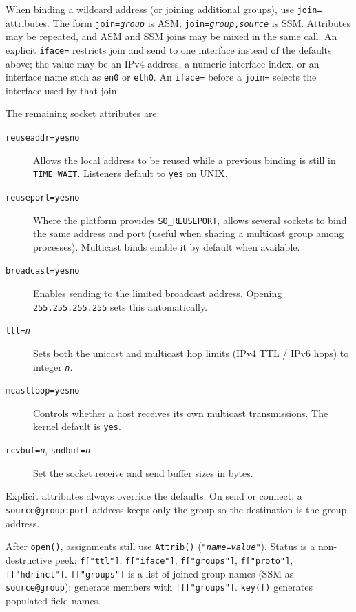 When binding a wildcard address (or joining additional groups), use
\texttt{join=} attributes. The form \texttt{join=\textit{group}} is ASM;
\texttt{join=\textit{group},\textit{source}} is SSM. Attributes may be
repeated, and ASM and SSM joins may be mixed in the same call. An
explicit \texttt{iface=} restricts join and send to one interface
instead of the defaults above; the value may be an IPv4 address, a
numeric interface index, or an interface name such as \texttt{en0} or
\texttt{eth0}. An \texttt{iface=} before a \texttt{join=} selects the
interface used by that join:


The remaining socket attributes are:

\begin{description}
\item[\texttt{reuseaddr=yes{\textbar}no}]
Allows the local address to be reused while a previous binding is
still in \texttt{TIME\_WAIT}. Listeners default to \texttt{yes} on
UNIX.
\item[\texttt{reuseport=yes{\textbar}no}]
Where the platform provides \texttt{SO\_REUSEPORT}, allows several
sockets to bind the same address and port (useful when sharing a
multicast group among processes). Multicast binds enable it by
default when available.
\item[\texttt{broadcast=yes{\textbar}no}]
Enables sending to the limited broadcast address. Opening
\texttt{255.255.255.255} sets this automatically.
\item[\texttt{ttl=\textit{n}}]
Sets both the unicast and multicast hop limits (IPv4 TTL /
IPv6 hops) to integer \texttt{\textit{n}}.
\item[\texttt{mcastloop=yes{\textbar}no}]
Controls whether a host receives its own multicast transmissions.
The kernel default is \texttt{yes}.
\item[\texttt{rcvbuf=\textit{n}}, \texttt{sndbuf=\textit{n}}]
Set the socket receive and send buffer sizes in bytes.
\end{description}

Explicit attributes always override the defaults. On send or connect,
a \texttt{source@group:port} address keeps only the group so the
destination is the group address.

After \texttt{open()}, assignments still use
\texttt{Attrib()} (\texttt{"\textit{name}=\textit{value}"}).
Status is a non-destructive peek: \texttt{f["ttl"]}, \texttt{f["iface"]},
\texttt{f["groups"]}, \texttt{f["proto"]}, \texttt{f["hdrincl"]}.
\texttt{f["groups"]} is a list of joined group names (SSM as
\texttt{source@group}); generate members with \texttt{!f["groups"]}.
\texttt{key(f)} generates populated field names.

